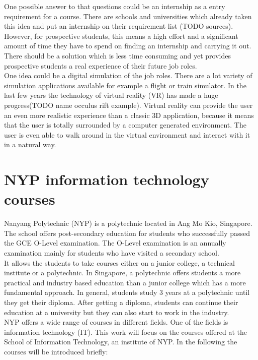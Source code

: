 One possible answer to that questions could be an internship as a entry requirement for a course. There are schools and universities which already taken this idea and put an internship on their requirement list (TODO sources). However, for prospective students, this means a high effort and a significant amount of time they have to spend on finding an internship and carrying it out. There should be a solution which is less time consuming and yet provides prospective students a real experience of their future job roles.\\
One idea could be a digital simulation of the job roles. There are a lot variety of simulation applications available for example a flight or train simulator. In the last few years the technology of virtual reality (VR) has made a huge progress(TODO name occulus rift example). Virtual reality can provide the user an even more realistic experience than a classic 3D application, because it means that the user is totally surrounded by a computer generated environment. The user is even able to walk around in the virtual environment and interact with it in a natural way.

 
\section{NYP information technology courses}
Nanyang Polytechnic (NYP) is a polytechnic located in Ang Mo Kio, Singapore. The school offers post-secondary education for students who successfully passed the GCE O-Level examination. The O-Level examination is an annually examination mainly for students who have visited a secondary school. \cite{aboutOLevel} \\ 
It allows the students to take courses either on a junior college, a technical institute or a polytechnic. In Singapore, a polytechnic offers students a more practical and industry based education than a junior college which has a more fundamental approach. In general, students study 3 years at a polytechnic until they get their diploma. After getting a diploma, students can continue their education at a university but they can also start to work in the industry. \cite{schoolSystem}\\
NYP offers a wide range of courses in different fields. One of the fields is information technology (IT). This work will focus on the courses offered at the School of Information Technology, an institute of NYP. In the following the courses will be introduced briefly: \cite{nypCourses}

